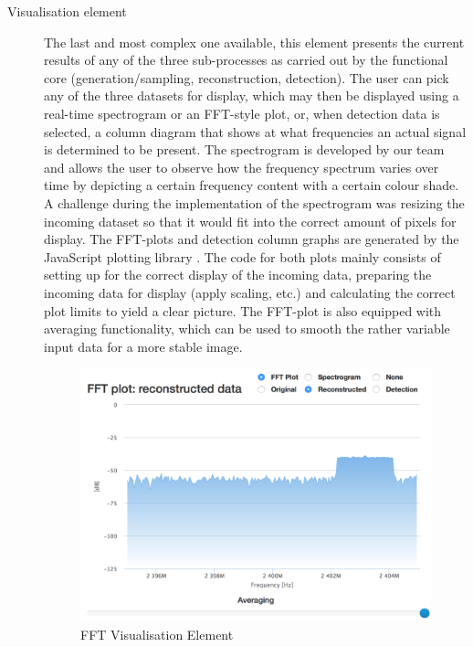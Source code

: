 \documentclass[a4paper, openany, oneside]{memoir}
\begin{document}
\begin{description}
	\item[Visualisation element]
	The last and most complex one available, this element presents the current results of any of the three sub-processes as carried out by the functional core (generation/sampling, reconstruction, detection). The user can pick any of the three datasets for display, which may then be displayed using a real-time spectrogram or an FFT-style plot, or, when detection data is selected, a column diagram that shows at what frequencies an actual signal is determined to be present.
	The spectrogram is developed by our team and allows the user to observe how the frequency spectrum varies over time by depicting a certain frequency content with a certain colour shade. A challenge during the implementation of the spectrogram was resizing the incoming dataset so that it would fit into the correct amount of pixels for display.
	The FFT-plots and detection column graphs are generated by the JavaScript plotting library . The code for both plots mainly consists of setting up  for the correct display of the incoming data, preparing the incoming data for display (apply scaling, etc.) and calculating the correct plot limits to yield a clear picture.
	The FFT-plot is also equipped with averaging functionality, which can be used to smooth the rather variable input data for a more stable image.

\begin{figure}[H]
    \centering
    \includegraphics[width=\textwidth]{fft.png}
    \caption{FFT Visualisation Element}
    \label{fig:fft_element}
\end{figure}


\end{description}
\end{document}
